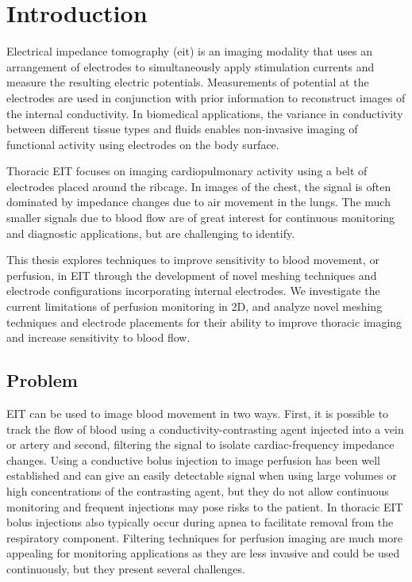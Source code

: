 \chapter{Introduction}

Electrical impedance tomography (\acrshort{eit}) is an imaging modality that uses an arrangement 
of electrodes to simultaneously apply 
stimulation currents and measure 
the resulting electric potentials. Measurements of potential at the 
electrodes are used in conjunction with 
prior information to reconstruct images 
of the internal conductivity. In biomedical applications, 
the variance in conductivity between different 
tissue types and fluids enables non-invasive 
imaging of functional activity using electrodes on the 
body surface. 

Thoracic EIT focuses on imaging cardiopulmonary activity
using a belt of electrodes placed around the ribcage.
In images of the chest, the signal is often dominated by 
impedance changes due to air movement in the lungs. 
The much smaller signals due to blood flow are of great interest for 
continuous monitoring and diagnostic applications,
but are challenging to identify. 

This thesis explores techniques to improve sensitivity to blood movement, or perfusion,  
in EIT through the development of novel meshing techniques and electrode configurations
incorporating internal electrodes. 
We investigate the current limitations of perfusion monitoring in 2D, and
analyze novel meshing techniques and electrode placements for their 
ability to improve thoracic imaging and increase sensitivity to blood flow. 

\section{Problem}

EIT can be used to image blood movement in two ways. 
First, it is possible to track the flow of blood using a 
conductivity-contrasting agent injected into a vein or artery
and second, filtering the signal to isolate cardiac-frequency 
impedance changes. 
Using a conductive bolus injection to image perfusion has been well established and 
can give an easily detectable signal when using large volumes
or high concentrations of the contrasting agent, but they do not 
allow continuous monitoring and frequent injections may pose 
risks to the patient.
In thoracic EIT bolus injections also typically occur during apnea to 
facilitate removal from the respiratory component.
Filtering techniques for perfusion imaging are much more appealing for 
monitoring applications as they are less invasive 
and could be used continuously, but they present several challenges. 

